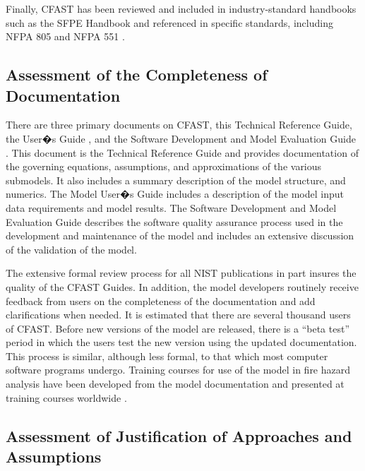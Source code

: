 Finally, CFAST has been reviewed and included in industry-standard handbooks such as the SFPE Handbook \cite{Walton:2003} and referenced in specific standards, including NFPA 805 \cite{NFPA805:2004} and NFPA 551 \cite{NFPA551:2004}.

\subsection{Assessment of the Completeness of Documentation}

There are three primary documents on CFAST, this Technical Reference Guide, the User�s Guide \cite{CFAST_Users_Guide_6}, and the Software Development and Model Evaluation Guide \cite{CFAST_Valid_Guide_6}.  This document is the Technical Reference Guide and provides documentation of the governing equations, assumptions, and approximations of the various submodels. It also includes a summary description of the model structure, and numerics.  The Model User�s Guide includes a description of the model input data requirements and model results. The Software Development and Model Evaluation Guide describes the software quality assurance process used in the development and maintenance of the model and includes an extensive discussion of the validation of the model.

The extensive formal review process for all NIST publications in part insures the quality of the CFAST Guides. In addition, the model developers routinely receive feedback from users on the completeness of the documentation and add clarifications when needed. It is estimated that there are several thousand users of CFAST. Before new versions of the model are released, there is a ``beta test'' period in which the users test the new version using the updated documentation. This process is similar, although less formal, to that which most computer software programs undergo. Training courses for use of the model in fire hazard analysis have been developed from the model documentation and presented at training courses worldwide \cite{Barnett:1990}.

\subsection{Assessment of Justification of Approaches and Assumptions}

